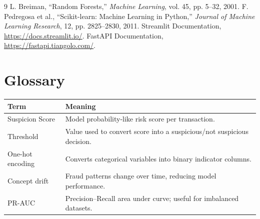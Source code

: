 \documentclass[12pt,a4paper]{report}
\begin{document}
\begin{thebibliography}{9}
 L. Breiman, ``Random Forests,'' \textit{Machine Learning}, vol. 45, pp. 5--32, 2001.
 F. Pedregosa et al., ``Scikit-learn: Machine Learning in Python,'' \textit{Journal of Machine Learning Research}, 12, pp. 2825--2830, 2011.
 Streamlit Documentation, \url{https://docs.streamlit.io/}.
 FastAPI Documentation, \url{https://fastapi.tiangolo.com/}.
\end{thebibliography}

\chapter*{Glossary}
\begin{longtable}{p{4cm}p{10cm}}
\toprule
\textbf{Term} & \textbf{Meaning} \\\midrule
Suspicion Score & Model probability-like risk score per transaction.\\
Threshold & Value used to convert score into a suspicious/not suspicious decision.\\
One-hot encoding & Converts categorical variables into binary indicator columns.\\
Concept drift & Fraud patterns change over time, reducing model performance.\\
PR-AUC & Precision--Recall area under curve; useful for imbalanced datasets.\\
\bottomrule
\end{longtable}
\end{document}
